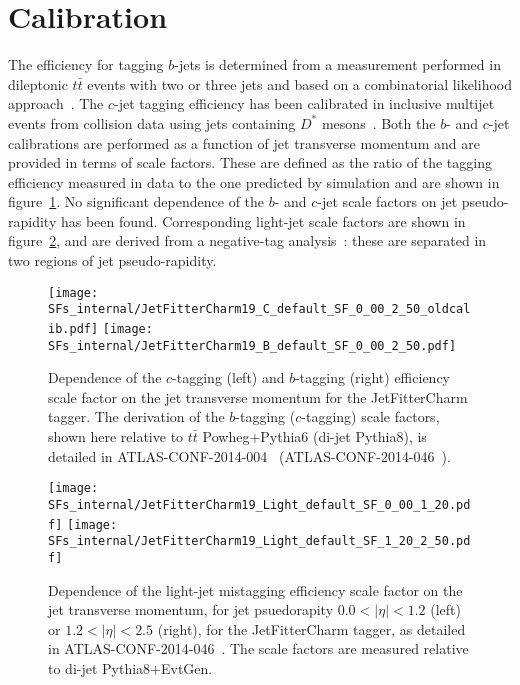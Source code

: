\section{Calibration}
\label{tag:sec:calib}
The efficiency for tagging $b$-jets is determined from a measurement performed in dileptonic $t\bar{t}$ events with two or three jets and based on a combinatorial likelihood approach~\cite{Giacinto}. The $c$-jet tagging efficiency has been calibrated in inclusive multijet events from collision data using jets  containing $D^*$ mesons~\cite{bc2014}. Both the $b$- and $c$-jet calibrations are performed as a function of jet transverse momentum and are provided in terms of scale factors. These are defined as the ratio of the tagging efficiency measured in data to the one predicted by simulation and are shown in figure~\ref{tag:JFC_SF_B}.  No significant dependence of the $b$- and $c$-jet scale factors on jet pseudo-rapidity has been found. Corresponding light-jet scale factors are shown in figure~\ref{tag:JFC_SF_L1}, and are derived from a negative-tag analysis~\cite{bc2014}: these are separated in two regions of jet pseudo-rapidity.

\newcommand{\lSF}{as detailed in ATLAS-CONF-2014-046~\cite{bc2014}. The scale factors are measured relative to di-jet Pythia8+EvtGen.} %
\newcommand{\cSF}{as detailed in ATLAS-CONF-2014-046~\cite{bc2014}. The scale factors are measured relative to di-jet Pythia8.} %
\newcommand{\bSF}{as detailed in ATLAS-CONF-2014-004~\cite{Giacinto}. The scale factors are measured relative to $t \bar{t}$ Powheg+Pythia6.} %

\begin{figure}[!h]
  \centering
  \texttt{[image: SFs\_internal/JetFitterCharm19\_C\_default\_SF\_0\_00\_2\_50\_oldcalib.pdf]}
  \texttt{[image: SFs\_internal/JetFitterCharm19\_B\_default\_SF\_0\_00\_2\_50.pdf]}
  \caption{Dependence of the $c$-tagging (left) and $b$-tagging (right) efficiency scale factor on the jet transverse momentum for the JetFitterCharm tagger. The derivation of the $b$-tagging ($c$-tagging) scale factors, shown here relative to $t \bar{t}$ Powheg+Pythia6 (di-jet Pythia8), is detailed in ATLAS-CONF-2014-004~\cite{Giacinto} (ATLAS-CONF-2014-046~\cite{bc2014}).}
  \label{tag:JFC_SF_B}
\end{figure}

\begin{figure}[!htb]
  \centering
  \texttt{[image: SFs\_internal/JetFitterCharm19\_Light\_default\_SF\_0\_00\_1\_20.pdf]}
  \texttt{[image: SFs\_internal/JetFitterCharm19\_Light\_default\_SF\_1\_20\_2\_50.pdf]}
  \caption{Dependence of the light-jet mistagging efficiency scale factor on the jet transverse momentum, for jet psuedorapity $0.0 < | \eta | < 1.2$ (left) or $1.2 < | \eta | < 2.5$ (right), for the JetFitterCharm tagger, \lSF}
  
  \label{tag:JFC_SF_L1}
\end{figure}

